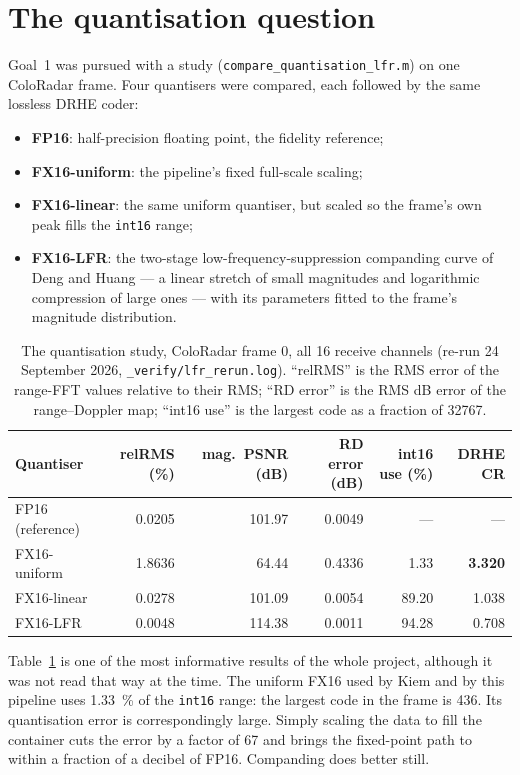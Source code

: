 \section{The quantisation question}
\label{sec:jr_quant}

Goal~1 was pursued with a study (\texttt{compare\_quantisation\_lfr.m}) on one
ColoRadar frame. Four quantisers were compared, each followed by the same
lossless DRHE coder:

\begin{itemize}
\item \textbf{FP16}: half-precision floating point, the fidelity reference;
\item \textbf{FX16-uniform}: the pipeline's fixed full-scale scaling;
\item \textbf{FX16-linear}: the same uniform quantiser, but scaled so the
frame's own peak fills the \texttt{int16} range;
\item \textbf{FX16-LFR}: the two-stage low-frequency-suppression companding
curve of Deng and Huang \cite{deng2024} --- a linear stretch of small magnitudes
and logarithmic compression of large ones --- with its parameters fitted to the
frame's magnitude distribution.
\end{itemize}

\begin{table}[htbp]
\centering
\caption[Quantisation study]{The quantisation study, ColoRadar frame 0, all
16 receive channels (re-run 24 September 2026, \texttt{\_verify/lfr\_rerun.log}).
``relRMS'' is the RMS error of the range-FFT values relative to their RMS;
``RD error'' is the RMS dB error of the range--Doppler map; ``int16 use'' is the
largest code as a fraction of 32767.}
\label{tab:jr_lfr}
\small
\begin{tabular}{@{}lrrrrr@{}}
\toprule
Quantiser & relRMS (\%) & mag.\ PSNR (dB) & RD error (dB) & int16 use (\%) & DRHE CR\\
\midrule
FP16 (reference)   & 0.0205 & 101.97 & 0.0049 & ---   & ---\\
FX16-uniform       & 1.8636 & 64.44  & 0.4336 & 1.33  & \textbf{3.320}\\
FX16-linear        & 0.0278 & 101.09 & 0.0054 & 89.20 & 1.038\\
FX16-LFR           & 0.0048 & 114.38 & 0.0011 & 94.28 & 0.708\\
\bottomrule
\end{tabular}
\end{table}

Table~\ref{tab:jr_lfr} is one of the most informative results of the whole
project, although it was not read that way at the time. The uniform FX16 used by
Kiem and by this pipeline uses \SI{1.33}{\percent} of the \texttt{int16}
range: the largest code in the frame is 436. Its quantisation error is
correspondingly large. Simply scaling the data to fill the container cuts the
error by a factor of 67 and brings the fixed-point path to within a fraction of
a decibel of FP16. Companding does better still.

